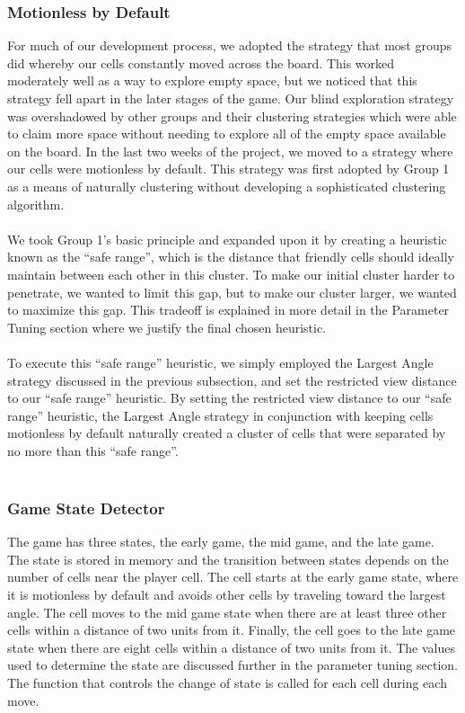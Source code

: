 \subsubsection{Motionless by Default}
For much of our development process, we adopted the strategy that most groups did whereby our cells constantly moved across the board. This worked moderately well as a way to explore empty space, but we noticed that this strategy fell apart in the later stages of the game. Our blind exploration strategy was overshadowed by other groups and their clustering strategies which were able to claim more space without needing to explore all of the empty space available on the board. In the last two weeks of the project, we moved to a strategy where our cells were motionless by default. This strategy was first adopted by Group 1 as a means of naturally clustering without developing a sophisticated clustering algorithm.\\\\
We took Group 1’s basic principle and expanded upon it by creating a heuristic known as the “safe range”, which is the distance that friendly cells should ideally maintain between each other in this cluster. To make our initial cluster harder to penetrate, we wanted to limit this gap, but to make our cluster larger, we wanted to maximize this gap. This tradeoff is explained in more detail in the Parameter Tuning section where we justify the final chosen heuristic.\\\\
To execute this “safe range” heuristic, we simply employed the Largest Angle strategy discussed in the previous subsection, and set the restricted view distance to our “safe range” heuristic. By setting the restricted view distance to our “safe range” heuristic, the Largest Angle strategy in conjunction with keeping cells motionless by default naturally created a cluster of cells that were separated by no more than this “safe range”.\\\\

\subsubsection{Game State Detector}
The game has three states, the early game, the mid game, and the late game. The state is stored in memory and the transition between states depends on the number of cells near the player cell. The cell starts at the early game state, where it is motionless by default and avoids other cells by traveling toward the largest angle. The cell moves to the mid game state when there are at least three other cells within a distance of two units from it. Finally, the cell goes to the late game state when there are eight cells within a distance of two units from it. The values used to determine the state are discussed further in the parameter tuning section. The function that controls the change of state is called for each cell during each move.\\

